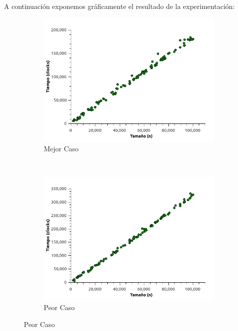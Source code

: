 A continuación exponemos gráficamente el resultado de la experimentación:

\begin{figure}[H]
        \centering
        \begin{subfigure}[b]{0.5\textwidth}
                \includegraphics[width=\textwidth]{imagenes/grafico1-mejor1.jpg}
                \caption{Mejor Caso}
        \end{subfigure}%
        ~ %
        \begin{subfigure}[b]{0.5\textwidth}
                \includegraphics[width=\textwidth]{imagenes/grafico1-peor1.jpg}
                \caption{Peor Caso}
        \end{subfigure}

\end{figure}

